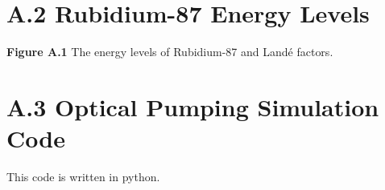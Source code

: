 \section*{A.2 Rubidium-87 Energy Levels}

\begin{figure}[t]
\begin{center}
\end{center}
\end{figure}
\textbf{Figure A.1} The energy levels of Rubidium-87 and Land\'e factors. \cite{steck} 

\section*{A.3 Optical Pumping Simulation Code}
This code is written in python. 
\newline
\inputminted[fontsize=\footnotesize, frame=leftline, linenos]{python}{optical_pumping.py}

\endinput

